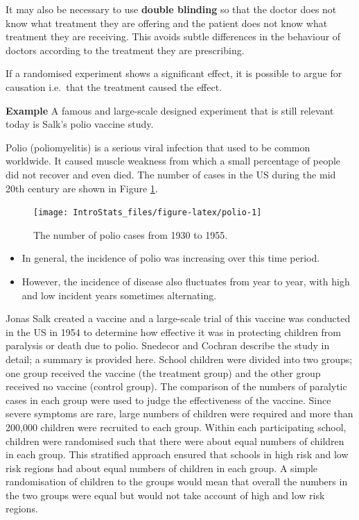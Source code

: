 \documentclass[
  oneside]{krantz}
\providecommand{\tightlist}{%
  \setlength{\itemsep}{0pt}\setlength{\parskip}{0pt}}
\begin{document}
It may also be necessary to use \textbf{double blinding} so that the doctor does not know what treatment they are offering and the patient does not know what treatment they are receiving. This avoids subtle differences in the behaviour of doctors according to the treatment they are prescribing.

If a randomised experiment shows a significant effect, it is possible to argue for causation i.e.~that the treatment caused the effect.

\textbf{Example} A famous and large-scale designed experiment that is still relevant today is Salk's polio vaccine study.

Polio (poliomyelitis) is a serious viral infection that used to be common worldwide. It caused muscle weakness from which a small percentage of people did not recover and even died. The number of cases in the US during the mid 20th century are shown in Figure \ref{fig:polio}.

\begin{figure}[!htbp]

{\centering \texttt{[image: IntroStats\_files/figure-latex/polio-1]} 

}

\caption{The number of polio cases from 1930 to 1955.}\label{fig:polio}
\end{figure}

\begin{itemize}
\tightlist
\item
  In general, the incidence of polio was increasing over this time period.
\item
  However, the incidence of disease also fluctuates from year to year, with high and low incident years sometimes alternating.
\end{itemize}

Jonas Salk created a vaccine and a large-scale trial of this vaccine was conducted in the US in 1954 to determine how effective it was in protecting children from paralysis or death due to polio. Snedecor and Cochran \citeyearpar{Snedecor&Cochran1980} describe the study in detail; a summary is provided here. School children were divided into two groups; one group received the vaccine (the treatment group) and the other group received no vaccine (control group). The comparison of the numbers of paralytic cases in each group were used to judge the effectiveness of the vaccine. Since severe symptoms are rare, large numbers of children were required and more than 200,000 children were recruited to each group. Within each participating school, children were randomised such that there were about equal numbers of children in each group. This stratified approach ensured that schools in high risk and low risk regions had about equal numbers of children in each group. A simple randomisation of children to the groups would mean that overall the numbers in the two groups were equal but would not take account of high and low risk regions.
\end{document}
